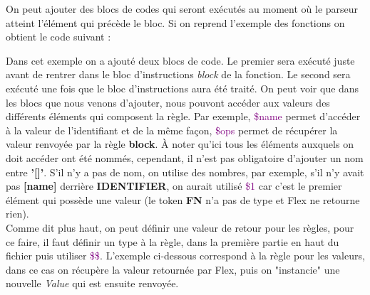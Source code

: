 \documentclass[a4paper]{article}%
\begin{document}
On peut ajouter des blocs de codes qui seront exécutés au moment où le parseur
atteint l'élément qui précède le bloc. Si on reprend l'exemple des fonctions on
obtient le code suivant :

\leavevmode\newline

Dans cet exemple on a ajouté deux blocs de code. Le premier sera exécuté juste
avant de rentrer dans le bloc d'instructions \textit{block} de la fonction. Le
second sera exécuté une fois que le bloc d'instructions aura été traité. On
peut voir que dans les blocs que nous venons d'ajouter, nous pouvont accéder
aux valeurs des différents éléments qui composent la règle. Par exemple,
\textcolor{purple}{\$name} permet d'accéder à la valeur de l'identifiant et de
la même façon, \textcolor{purple}{\$ops} permet de récupérer la valeur renvoyée
par la règle \textbf{block}. À noter qu'ici tous les éléments  auxquels on doit
accéder ont été nommés, cependant, il n'est pas obligatoire d'ajouter un nom
entre \textbf{'[]'}. S'il n'y a pas de nom, on utilise des nombres, par exemple,
s'il n'y avait pas \textbf{[name]} derrière \textbf{IDENTIFIER}, on aurait
utilisé \textcolor{purple}{\$1} car c'est le premier élément qui possède une
valeur (le token \textbf{FN} n'a pas de type et Flex ne retourne rien).\\


Comme dit plus haut, on peut définir une valeur de retour pour les règles, pour
ce faire, il faut définir un type à la règle, dans la première partie en haut du
fichier puis utiliser \textcolor{purple}{\$\$}. L'exemple ci-dessous correspond
à la règle pour les valeurs, dans ce cas on récupère la valeur retournée par
Flex, puis on "instancie" une nouvelle \textit{Value} qui est ensuite renvoyée.

\leavevmode\newline
\end{document}
